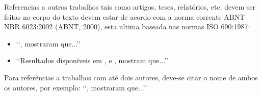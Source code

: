 Referencias a outros trabalhos tais como artigos, teses, relatórios, etc. devem 
ser feitas no corpo do texto devem estar de acordo com a norma corrente ABNT 
NBR 6023:2002 (ABNT, 2000), esta ultima baseada nas normas ISO 690:1987:
\begin{itemize}
	\item \lq\lq \cite{bordalo1989}, mostraram que...\rq\rq

	\item \lq\lq Resultados disponíveis em \cite{coimbra1978}, \cite{clark1986} 
	e \cite{sparrow1980}, mostram que...\rq\rq
\end{itemize}

Para referências a trabalhos com até dois autores, deve-se citar o nome de 
ambos os autores, por exemplo: \lq\lq \cite{soviero1997}, mostraram 
que...\rq\rq

